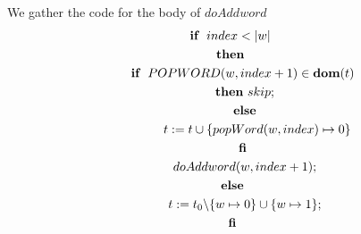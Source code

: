 \documentclass[a4paper,12pt,fleqn]{scrartcl}
\newcommand{\domt}{\textbf{dom}(t)}
\begin{document}
We gather the code for the body of $doAddword$
\begin{gather*}
    \IF\ ~index<|w|~\\
    \THEN\ \\
    \qquad \IF\ ~POPWORD(w,index+1)\in\domt~\\
    \qquad \THEN\ skip;\\
    \qquad \ELSE\\
    \qquad\qquad t\Ass t \cup \{popWord(w,index)\mapsto 0 \}\\
    \qquad \FI\ \\
    \qquad doAddword(w, index +1);\\
    \ELSE \\
    \qquad t \Ass t_0 \backslash \{ w\mapsto 0 \} \cup \{ w \mapsto 1\};\\
    \FI
\end{gather*}
\end{document}
